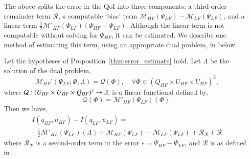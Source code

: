 The above  splits the error in the QoI into three components: a third-order remainder term $\mathcal{R}$, a computable `bias' term $\mathcal{M}_{HF}(\Psi_{LF})-\mathcal{M}_{LF}(\Psi_{LF})$, and a linear term $\frac{1}{2}\mathcal{M}'_{HF}(\Psi_{LF})(\Psi_{HF}-\Psi_{LF})$. Although the linear term is not computable without solving for $\Psi_{HF}$, it can be estimated. We describe one method of estimating this term, using an appropriate dual problem, in  below.

%
\begin{proposition}
\label{thm:error_estimate_dual}
Let the hypotheses of Proposition~\ref{thm:error_estimate} hold. Let $\Lambda$ be the solution of the dual problem, 
%
\begin{equation}
\mathcal{M}_{HF}'(\Psi_{LF};\Phi, \Lambda)=\mathcal{Q}(\Phi),\quad\forall\Phi\in(Q_{HF}\times U_{HF}\times U_{HF})^2,
\end{equation}
%
where $\mathcal{Q}:(U_{HF} \times U_{HF} \times Q_{HF})^2 \to {\mathbb{R}}$ is a linear functional defined by,
%
\begin{equation}
\mathcal{Q}(\Phi)=\mathcal{M}'_{HF}(\Psi_{LF})(\Phi).
\label{eq:supadjout}
\end{equation}
%
Then we have,
%
\begin{multline}
\label{eq:finErrExp}
I(q_{HF},u_{HF})-I(q_{LF},u_{LF})=\\-\frac{1}{2}\mathcal{M}'_{HF}(\Psi_{LF})(\Lambda)+\mathcal M_{HF}(\Psi_{LF})-\mathcal M_{LF}(\Psi_{LF}) + \mathcal{R}_{\mathscr{R}} + \mathcal{R}
\end{multline}
%
where $\mathcal{R}_{\mathscr{R}}$ is a second-order term in the error $e=\Psi_{HF}-\Psi_{LF}$, and $\mathcal{R}$ is as defined in . 
%
\end{proposition}
%
